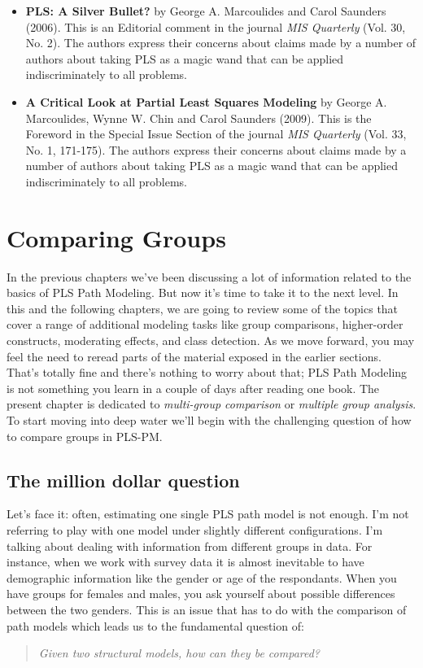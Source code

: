 \documentclass[12pt]{book}\usepackage{graphicx, color}
\begin{document}
\begin{itemize}
 \vspace{2mm}
 \item \textbf{\textsf{PLS: A Silver Bullet?}} by George A. Marcoulides and Carol Saunders (2006). This is an Editorial comment in the journal \textit{MIS Quarterly} (Vol. 30, No. 2). The authors express their concerns about claims made by a number of authors about taking PLS as a magic wand that can be applied indiscriminately to all problems.

 \vspace{2mm}
 \item \textbf{\textsf{A Critical Look at Partial Least Squares Modeling}} by George A. Marcoulides, Wynne W. Chin and Carol Saunders (2009). This is the Foreword in the Special Issue Section of the journal \textit{MIS Quarterly} (Vol. 33, No. 1, 171-175). The authors express their concerns about claims made by a number of authors about taking PLS as a magic wand that can be applied indiscriminately to all problems.
\end{itemize}
  





\chapter{Comparing Groups}
In the previous chapters we've been discussing a lot of information related to the basics of PLS Path Modeling. But now it's time to take it to the next level. In this and the following chapters, we are going to review some of the topics that cover a range of additional modeling tasks like group comparisons, higher-order constructs, moderating effects, and class detection. As we move forward, you may feel the need to reread parts of the material exposed in the earlier sections. That's totally fine and there's nothing to worry about that; PLS Path Modeling is not something you learn in a couple of days after reading one book. The present chapter is dedicated to \textit{multi-group comparison} or \textit{multiple group analysis}. To start moving into deep water we'll begin with the challenging question of how to compare groups in PLS-PM.


\section{The million dollar question}
Let's face it: often, estimating one single PLS path model is not enough. I'm not referring to 
play with one model under slightly different configurations. I'm talking about dealing with information from different groups in data. For instance, when we work with survey data it is almost inevitable to have demographic information like the gender or age of the respondants. When you have groups for females and males, you ask yourself about possible differences between the two genders. This is an issue that has to do with the comparison of path models which leads us to the fundamental question of: 
\begin{quote}
\textit{Given two structural models, how can they be compared?}
\end{quote}
\end{document}
